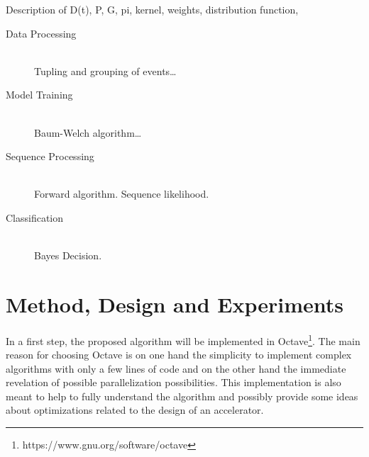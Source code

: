 \documentclass[12pt]{article} %
\begin{document}

Description of D(t), P, G, pi, kernel, weights, distribution
function,

\begin{description} %
    \item[Data Processing] \hfill \\
        Tupling and grouping of events\dots
    \item[Model Training] \hfill \\
        Baum-Welch algorithm\dots
    \item[Sequence Processing] \hfill \\
        Forward algorithm. Sequence likelihood.
    \item[Classification] \hfill \\
        Bayes Decision.
\end{description} 


\section{Method, Design and Experiments} %

In a first step, the proposed algorithm will be implemented in
Octave\footnote{https://www.gnu.org/software/octave}. The main reason for
choosing Octave is on one hand the simplicity to implement complex algorithms
with only a few lines of code and on the other hand the immediate revelation of
possible parallelization possibilities. This implementation is also meant to
help to fully understand the algorithm and possibly provide some ideas about
optimizations related to the design of an accelerator.
\end{document}
